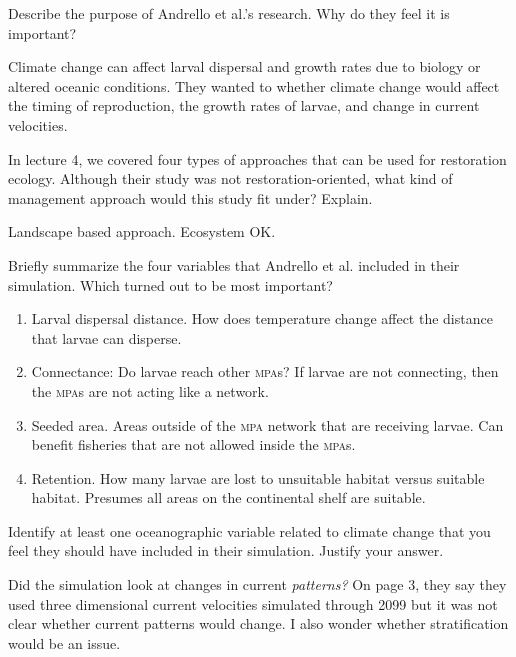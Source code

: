 \documentclass[12pt, addpoints]{exam}
\newcommand*\AnswerBox[2]{%
    \parbox[t][#1]{0.92\textwidth}{%
    \begin{solution}#2\end{solution}}
}
\newenvironment{AnswerPage}[1]
    {\begin{minipage}[t][#1]{0.92\textwidth}%
    \begin{solution}}
    {\end{solution}\end{minipage}
    \vspace*{\stretch{1}}}
\begin{document}
\begin{questions}

\question[3]
Describe the purpose of Andrello et al.'s research. Why do they feel it is important?


\AnswerBox{4\baselineskip}{%
Climate change can affect larval dispersal and growth rates due to biology or altered oceanic conditions. They wanted to whether climate change would affect the timing of reproduction, the growth rates of larvae, and change in current velocities.
}

\question[3]
In lecture 4, we covered four types of approaches that can be used for restoration ecology. Although their study was not restoration-oriented, what kind of management approach would this study fit under? Explain.

\AnswerBox{4\baselineskip}{%
Landscape based approach. Ecosystem OK.
}

\question[5]
Briefly summarize the four variables that Andrello et al. included in their simulation. Which turned out to be most important?
 
\begin{AnswerPage}{6\baselineskip}
\begin{enumerate}
	\item Larval dispersal distance. How does temperature change affect the distance that larvae can disperse.
	
	\item Connectance: Do larvae reach other \textsc{mpa}s? If larvae are not connecting, then the \textsc{mpa}s are not acting like a network.
	
	\item Seeded area. Areas outside of the \textsc{mpa} network that are receiving larvae. Can benefit fisheries that are not allowed inside the \textsc{mpa}s.
	
	\item Retention. How many larvae are lost to unsuitable habitat versus suitable habitat. Presumes all areas on the continental shelf are suitable.
\end{enumerate}
\end{AnswerPage}


\question[3]
Identify at least one oceanographic variable related to climate change that you feel they should have included in their simulation. Justify your answer.

\AnswerBox{4\baselineskip}{%
Did the simulation look at changes in current \textit{patterns?} On page 3, they say they used three dimensional current velocities simulated through 2099 but it was not clear whether current patterns would change. I also wonder whether stratification would be an issue.
}


\end{questions}
\end{document}
